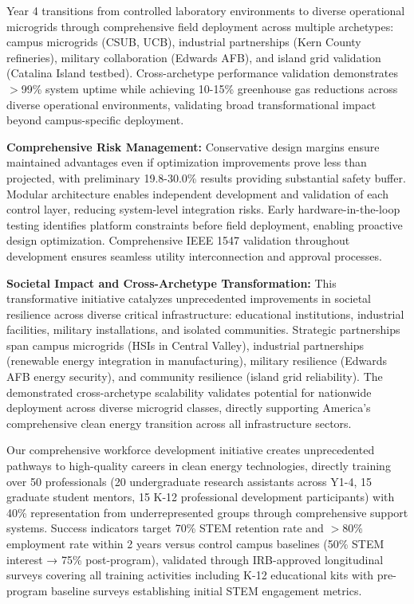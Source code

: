 \documentclass[12pt]{article}
\begin{document}
Year 4 transitions from controlled laboratory environments to diverse operational microgrids through comprehensive field deployment across multiple archetypes: campus microgrids (CSUB, UCB), industrial partnerships (Kern County refineries), military collaboration (Edwards AFB), and island grid validation (Catalina Island testbed). Cross-archetype performance validation demonstrates $>$99\% system uptime while achieving 10-15\% greenhouse gas reductions across diverse operational environments, validating broad transformational impact beyond campus-specific deployment.

\textbf{Comprehensive Risk Management:} Conservative design margins ensure maintained advantages even if optimization improvements prove less than projected, with preliminary 19.8-30.0\% results providing substantial safety buffer. Modular architecture enables independent development and validation of each control layer, reducing system-level integration risks. Early hardware-in-the-loop testing identifies platform constraints before field deployment, enabling proactive design optimization. Comprehensive IEEE 1547 validation \cite{ieee1547} throughout development ensures seamless utility interconnection and approval processes.

\textbf{Societal Impact and Cross-Archetype Transformation:} This transformative initiative catalyzes unprecedented improvements in societal resilience across diverse critical infrastructure: educational institutions, industrial facilities, military installations, and isolated communities. Strategic partnerships span campus microgrids (HSIs in Central Valley), industrial partnerships (renewable energy integration in manufacturing), military resilience (Edwards AFB energy security), and community resilience (island grid reliability). The demonstrated cross-archetype scalability validates potential for nationwide deployment across diverse microgrid classes, directly supporting America's comprehensive clean energy transition across all infrastructure sectors.

Our comprehensive workforce development initiative creates unprecedented pathways to high-quality careers in clean energy technologies, directly training over 50 professionals (20 undergraduate research assistants across Y1-4, 15 graduate student mentors, 15 K-12 professional development participants) with 40\% representation from underrepresented groups through comprehensive support systems. Success indicators target 70\% STEM retention rate and $>$80\% employment rate within 2 years versus control campus baselines (50\% STEM interest → 75\% post-program), validated through IRB-approved longitudinal surveys covering all training activities including K-12 educational kits with pre-program baseline surveys establishing initial STEM engagement metrics.
\end{document}
